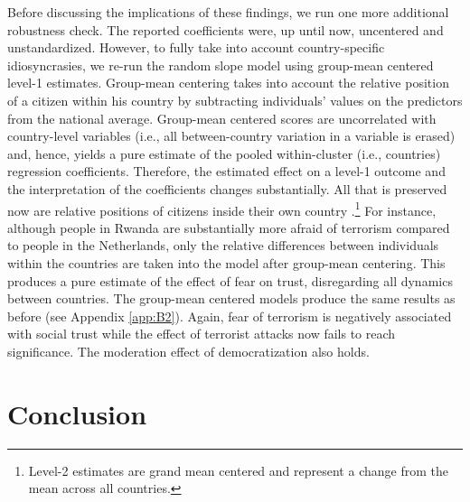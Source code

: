 Before discussing the implications of these findings, we run one more additional robustness check. The reported coefficients were, up until now, uncentered and unstandardized. However, to fully take into account country-specific idiosyncrasies, we re-run the random slope model using group-mean centered level-1 estimates. Group-mean centering takes into account the relative position of a citizen within his country by subtracting individuals’ values on the predictors from the national average. Group-mean centered scores are uncorrelated with country-level variables (i.e., all between-country variation in a variable is erased) and, hence, yields a pure estimate of the pooled within-cluster (i.e., countries) regression coefficients. Therefore, the estimated effect on a level-1 outcome and the interpretation of the coefficients changes substantially. All that is preserved now are relative positions of citizens inside their own country \citep{Enders2007, CastanhoSilva2019}.\footnote{Level-2 estimates are grand mean centered and represent a change from the mean across all countries.} For instance, although people in Rwanda are substantially more afraid of terrorism compared to people in the Netherlands, only the relative differences between individuals within the countries are taken into the model after group-mean centering. This produces a pure estimate of the effect of fear on trust, disregarding all dynamics between countries. The group-mean centered models produce the same results as before (see Appendix \ref{app:B2}). Again, fear of terrorism is negatively associated with social trust while the effect of terrorist attacks now fails to reach significance. The moderation effect of democratization also holds.


\section{Conclusion}

